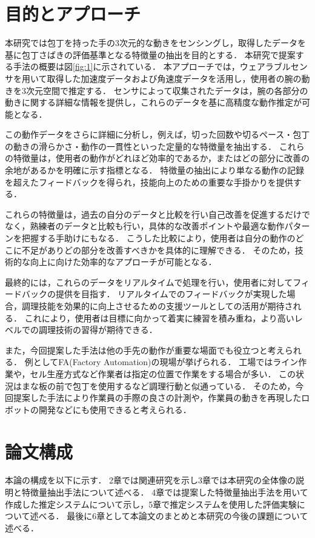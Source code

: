 \section{目的とアプローチ}
本研究では包丁を持った手の3次元的な動きをセンシングし，取得したデータを基に包丁さばきの評価基準となる特徴量の抽出を目的とする．
本研究で提案する手法の概要は図\ref{fig:1}に示されている．
本アプローチでは，ウェアラブルセンサを用いて取得した加速度データおよび角速度データを活用し，使用者の腕の動きを3次元空間で推定する．
センサによって収集されたデータは，腕の各部分の動きに関する詳細な情報を提供し，これらのデータを基に高精度な動作推定が可能となる．

この動作データをさらに詳細に分析し，例えば，切った回数や切るペース・包丁の動きの滑らかさ・動作の一貫性といった定量的な特徴量を抽出する．
これらの特徴量は，使用者の動作がどれほど効率的であるか，またはどの部分に改善の余地があるかを明確に示す指標となる．
特徴量の抽出により単なる動作の記録を超えたフィードバックを得られ，技能向上のための重要な手掛かりを提供する．

これらの特徴量は，過去の自分のデータと比較を行い自己改善を促進するだけでなく，熟練者のデータと比較も行い，具体的な改善ポイントや最適な動作パターンを把握する手助けにもなる．
こうした比較により，使用者は自分の動作のどこに不足がありどの部分を改善すべきかを具体的に理解できる．
そのため，技術的な向上に向けた効率的なアプローチが可能となる．

最終的には，これらのデータをリアルタイムで処理を行い，使用者に対してフィードバックの提供を目指す．
リアルタイムでのフィードバックが実現した場合，調理技能を効果的に向上させるための支援ツールとしての活用が期待される．
これにより，使用者は目標に向かって着実に練習を積み重ね，より高いレベルでの調理技術の習得が期待できる．

また，今回提案した手法は他の手先の動作が重要な場面でも役立つと考えられる．
例としてFA(Factory Automation)の現場が挙げられる．
工場ではライン作業や，セル生産方式など作業者は指定の位置で作業をする場合が多い．
この状況はまな板の前で包丁を使用するなど調理行動と似通っている．
そのため，今回提案した手法により作業員の手際の良さの計測や，作業員の動きを再現したロボットの開発などにも使用できると考えられる．

\section{論文構成}
本論の構成を以下に示す．
2章では関連研究を示し3章では本研究の全体像の説明と特徴量抽出手法について述べる．
4章では提案した特徴量抽出手法を用いて作成した推定システムについて示し，5章で推定システムを使用した評価実験について述べる．
最後に6章として本論文のまとめと本研究の今後の課題について述べる．